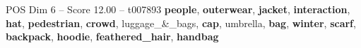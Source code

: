 \begin{textsample}{POS Dim 6 – Score 12.00 – t007893}  \label{ex:f6_pos_026}
\textbf{people}, \textbf{outerwear}, \textbf{jacket}, \textbf{interaction}, \textbf{hat}, \textbf{pedestrian}, \textbf{crowd}, luggage\_\&\_bags, \textbf{cap}, umbrella, \textbf{bag}, \textbf{winter}, \textbf{scarf}, \textbf{backpack}, \textbf{hoodie}, \textbf{feathered\_hair}, \textbf{handbag}

\end{textsample}
